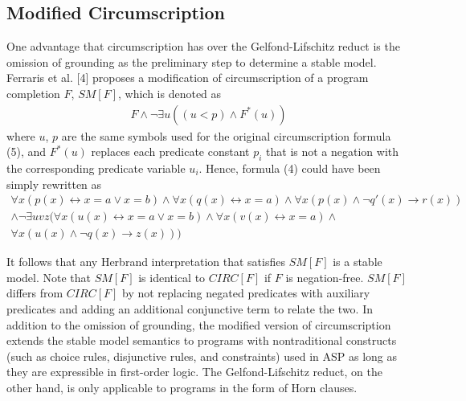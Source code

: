 \subsection{Modified Circumscription}
One advantage that circumscription has over the Gelfond-Lifschitz reduct 
is the omission of grounding as the preliminary step to determine a stable 
model. Ferraris et al. [4] proposes a modification of circumscription of 
a program completion $F$, $SM[F]$, which is denoted as 
\begin{align}
    F \land \neg \exists u((u < p) \land F^*(u)) 
\end{align}
where $u$, $p$ are the same symbols used for the original circumscription formula (5), 
and $F^*(u)$ 
replaces each predicate constant $p_i$ that is not a negation with 
the corresponding predicate variable $u_i$. Hence, formula (4) could 
have been simply rewritten as 
\begin{multline*}
    \forall x (p(x) \leftrightarrow x = a \lor x = b) \land 
    \forall x (q(x) \leftrightarrow x = a) \land 
    \forall x (p(x) \land \neg q'(x) \rightarrow r(x)) \\ 
    \land \neg \exists uvz (
        \forall x (u(x) \leftrightarrow x = a \lor x = b) \land 
        \forall x (v(x) \leftrightarrow x = a) \land 
        \\ \forall x (u(x) \land \neg q(x) \rightarrow z(x)) 
    ) 
\end{multline*}

It follows 
that any Herbrand interpretation that satisfies $SM[F]$ is a stable model. 
Note that $SM[F]$ is identical to $CIRC[F]$ if $F$ is negation-free. 
$SM[F]$ differs from $CIRC[F]$ by not replacing  
negated predicates with auxiliary predicates and adding an additional 
conjunctive term to relate the two. In addition to the omission of 
grounding, the modified version of circumscription 
extends the stable model semantics to programs with nontraditional constructs 
(such as choice rules, disjunctive rules, and constraints) used in ASP as 
long as they are expressible in first-order logic. The Gelfond-Lifschitz reduct, 
on the other hand, is only applicable to programs in the form of Horn clauses.

